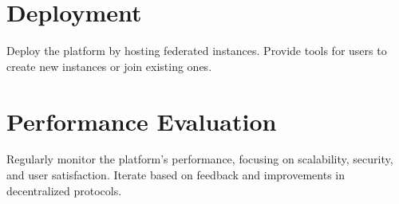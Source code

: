 \section{Deployment}
Deploy the platform by hosting federated instances. Provide tools for users to create new instances or join existing ones.

\section{Performance Evaluation}
Regularly monitor the platform’s performance, focusing on scalability, security, and user satisfaction. Iterate based on feedback and improvements in decentralized protocols.
